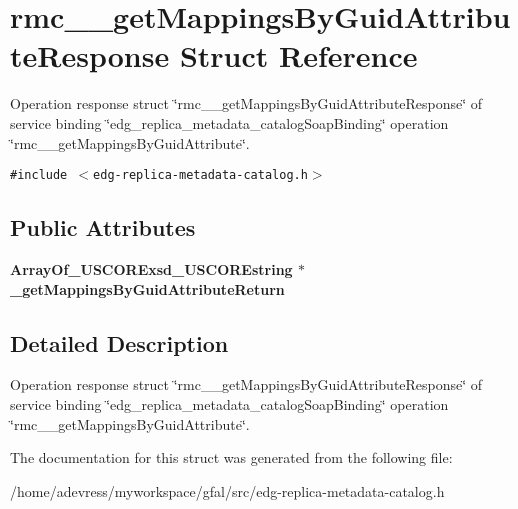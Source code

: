 \section{rmc\_\-\_\-get\-Mappings\-By\-Guid\-Attribute\-Response Struct Reference}
\label{structrmc____getMappingsByGuidAttributeResponse}
Operation response struct \char`\"{}rmc\_\-\_\-get\-Mappings\-By\-Guid\-Attribute\-Response\char`\"{} of service binding \char`\"{}edg\_\-replica\_\-metadata\_\-catalog\-Soap\-Binding\char`\"{} operation \char`\"{}rmc\_\-\_\-get\-Mappings\-By\-Guid\-Attribute\char`\"{}.  


{\tt \#include $<$edg-replica-metadata-catalog.h$>$}

\subsection*{Public Attributes}
\begin{CompactItemize}
\item 
\bf{Array\-Of\_\-USCORExsd\_\-USCOREstring} $\ast$ \textbf{\_\-get\-Mappings\-By\-Guid\-Attribute\-Return}\label{structrmc____getMappingsByGuidAttributeResponse_919fb007da4d660b00fb1ffa3f7adeda}

\end{CompactItemize}


\subsection{Detailed Description}
Operation response struct \char`\"{}rmc\_\-\_\-get\-Mappings\-By\-Guid\-Attribute\-Response\char`\"{} of service binding \char`\"{}edg\_\-replica\_\-metadata\_\-catalog\-Soap\-Binding\char`\"{} operation \char`\"{}rmc\_\-\_\-get\-Mappings\-By\-Guid\-Attribute\char`\"{}. 



The documentation for this struct was generated from the following file:\begin{CompactItemize}
\item 
/home/adevress/myworkspace/gfal/src/edg-replica-metadata-catalog.h\end{CompactItemize}
